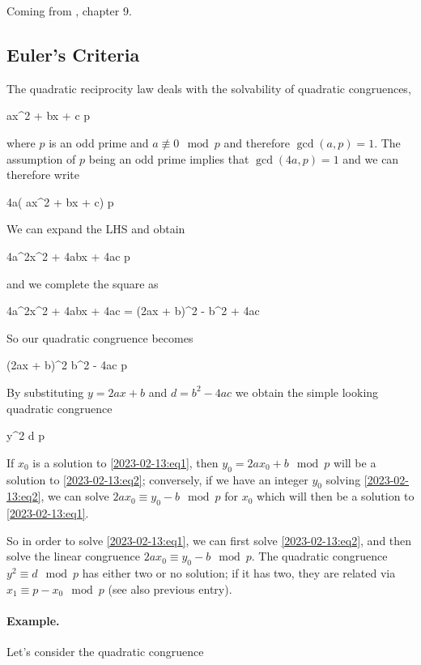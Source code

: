 
Coming from \cite{Burton2011}, chapter 9.

\subsection{Euler’s Criteria}

The quadratic reciprocity law deals with the solvability of quadratic congruences,

\be\label{2023-02-13:eq1}
ax^2 + bx + c  \mod p
\ee

where $p$ is an odd prime and $a \not\equiv 0 \mod p$ and therefore $\gcd(a,p) = 1$. The assumption of $p$ being an odd prime implies that $\gcd(4a, p) = 1$  and we can therefore write

\bee
4a( ax^2 + bx + c)  \mod p
\eee

We can expand the LHS and obtain

\bee
4a^2x^2 + 4abx + 4ac  \mod p
\eee

and we complete the square as

\bee
4a^2x^2 + 4abx + 4ac = (2ax + b)^2 - b^2 + 4ac
\eee

So our quadratic congruence becomes

\bee
(2ax + b)^2 \equiv b^2 - 4ac \mod p
\eee

By substituting $y = 2ax + b$ and $d = b^2 - 4ac$ we obtain the simple looking quadratic congruence

\be\label{2023-02-13:eq2}
y^2 \equiv d \mod p
\ee

If $x_0$ is a solution to \eqref{2023-02-13:eq1}, then $y_0 = 2ax_0 + b \mod p$ will be a solution to \eqref{2023-02-13:eq2}; conversely, if we have an integer $y_0$ solving \eqref{2023-02-13:eq2}, we can solve $2ax_0 \equiv y_0 - b \mod p$ for $x_0$ which will then be a solution to \eqref{2023-02-13:eq1}.

So in order to solve \eqref{2023-02-13:eq1}, we can first solve \eqref{2023-02-13:eq2}, and then solve the linear congruence $2ax_0 \equiv y_0 - b \mod p$. The quadratic congruence $y^2 \equiv d \mod p$ has either two or no solution; if it has two, they are related via $x_1 \equiv p - x_0 \mod p$ (see also previous entry).

\paragraph{Example.} Let's consider the quadratic congruence

